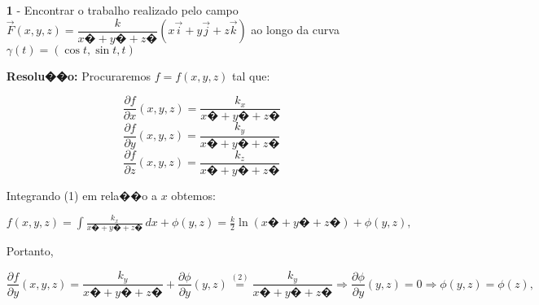 \documentclass[12pt]{article}
\newcommand{\integral}{\displaystyle\int}
\begin{document}
\begin{enumerate}
    \item[\textbf{1}]- Encontrar o trabalho realizado pelo campo $\vec{F}(x,y,z)=\dfrac{k}{x�+y�+z�}(x\vec{i}+y\vec{j}+z\vec{k})$ ao longo da curva $\gamma(t)=(\cos t,\sin t,t)$

          \textbf{Resolu��o:} Procuraremos $f=f(x,y,z)$ tal que:


          \begin{equation}
              \dfrac{\partial f}{\partial x}(x,y,z)=\dfrac{k_x}{x�+y�+z�}
          \end{equation}
          \begin{equation}
              \dfrac{\partial f}{\partial y}(x,y,z)=\dfrac{k_y}{x�+y�+z�}
          \end{equation}
          \begin{equation}
              \dfrac{\partial f}{\partial z}(x,y,z)=\dfrac{k_z}{x�+y�+z�}
          \end{equation}



          Integrando (1) em rela��o a $x$ obtemos:

          \begin{center}

              $f(x,y,z)=\integral \frac{k_x}{x�+y�+z�}\,dx + \phi (y,z) = \frac{k}{2} \ln(x�+y�+z�)+ \phi (y,z),$

          \end{center}

          Portanto,

          \begin{center}

              $\dfrac{\partial f}{\partial y}(x,y,z)=\dfrac{k_y}{x�+y�+z�}+\dfrac{\partial \phi}{\partial y}(y,z) \stackrel{(2)}{=} \dfrac{k_y}{x�+y�+z�} \Longrightarrow \dfrac{\partial \phi}{\partial y}(y,z)= 0 \Longrightarrow \phi (y,z) = \phi(z),$
          \end{center}


\end{enumerate}
\end{document}
